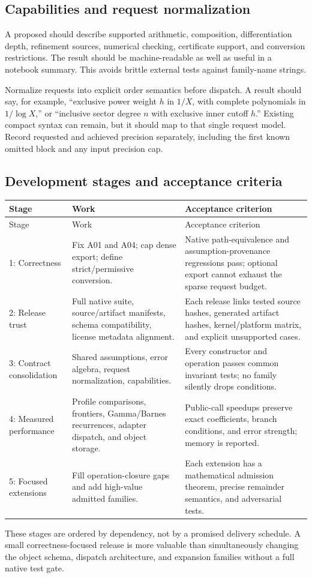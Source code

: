 \subsection{Capabilities and request normalization}
A proposed  should describe supported arithmetic, composition, differentiation depth, refinement sources, numerical checking, certificate support, and conversion restrictions. The result should be machine-readable as well as useful in a notebook summary. This avoids brittle external tests against family-name strings.

Normalize requests into explicit order semantics before dispatch. A result should say, for example, ``exclusive power weight $h$ in $1/X$, with complete polynomials in $1/\log X$,'' or ``inclusive sector degree $n$ with exclusive inner cutoff $h$.'' Existing compact syntax can remain, but it should map to that single request model. Record requested and achieved precision separately, including the first known omitted block and any input precision cap.

\subsection{Development stages and acceptance criteria}
\begin{longtable}{P{0.12\textwidth}P{0.4\textwidth}P{0.38\textwidth}}
\toprule Stage & Work & Acceptance criterion \\\midrule
\endfirsthead
\toprule Stage & Work & Acceptance criterion \\\midrule
{}: Correctness & Fix A01 and A04; cap dense export; define strict/permissive conversion. & Native path-equivalence and assumption-provenance regressions pass; optional export cannot exhaust the sparse request budget. \\
2: Release trust & Full native suite, source/artifact manifests, schema compatibility, license metadata alignment. & Each release links tested source hashes, generated artifact hashes, kernel/platform matrix, and explicit unsupported cases. \\
3: Contract consolidation & Shared assumptions, error algebra, request normalization, capabilities. & Every constructor and operation passes common invariant tests; no family silently drops conditions. \\
4: Measured performance & Profile comparisons, frontiers, Gamma/Barnes recurrences, adapter dispatch, and object storage. & Public-call speedups preserve exact coefficients, branch conditions, and error strength; memory is reported. \\
5: Focused extensions & Fill operation-closure gaps and add high-value admitted families. & Each extension has a mathematical admission theorem, precise remainder semantics, and adversarial tests. \\
\bottomrule
\end{longtable}
These stages are ordered by dependency, not by a promised delivery schedule. A small correctness-focused release is more valuable than simultaneously changing the object schema, dispatch architecture, and expansion families without a full native test gate.

